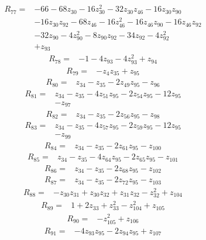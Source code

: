 \begin{align*}
R_{77}={}&-66-68z_{30}-16z_{30}^{2}-32z_{30}z_{46}-16z_{30}z_{90}\\
&-16z_{30}z_{92}-68z_{46}-16z_{46}^{2}-16z_{46}z_{90}-16z_{46}z_{92}\\
&-32z_{90}-4z_{90}^{2}-8z_{90}z_{92}-34z_{92}-4z_{92}^{2}\\
&+z_{93}
\end{align*}
\begin{align*}
R_{78}={}&-1-4z_{93}-4z_{93}^{2}+z_{94}
\end{align*}
\begin{align*}
R_{79}={}&-z_{4}z_{35}+z_{95}
\end{align*}
\begin{align*}
R_{80}={}&z_{34}-z_{35}-2z_{49}z_{95}-z_{96}
\end{align*}
\begin{align*}
R_{81}={}&z_{34}-z_{35}-4z_{51}z_{95}-2z_{54}z_{95}-12z_{95}\\
&-z_{97}
\end{align*}
\begin{align*}
R_{82}={}&z_{34}-z_{35}-2z_{56}z_{95}-z_{98}
\end{align*}
\begin{align*}
R_{83}={}&z_{34}-z_{35}-4z_{57}z_{95}-2z_{59}z_{95}-12z_{95}\\
&-z_{99}
\end{align*}
\begin{align*}
R_{84}={}&z_{34}-z_{35}-2z_{61}z_{95}-z_{100}
\end{align*}
\begin{align*}
R_{85}={}&z_{34}-z_{35}-4z_{64}z_{95}-2z_{65}z_{95}-z_{101}
\end{align*}
\begin{align*}
R_{86}={}&z_{34}-z_{35}-2z_{68}z_{95}-z_{102}
\end{align*}
\begin{align*}
R_{87}={}&z_{34}-z_{35}-2z_{72}z_{95}-z_{103}
\end{align*}
\begin{align*}
R_{88}={}&-z_{30}z_{31}+z_{30}z_{32}+z_{31}z_{32}-z_{32}^{2}+z_{104}
\end{align*}
\begin{align*}
R_{89}={}&1+2z_{33}+z_{33}^{2}-z_{104}^{2}+z_{105}
\end{align*}
\begin{align*}
R_{90}={}&-z_{105}^{2}+z_{106}
\end{align*}
\begin{align*}
R_{91}={}&-4z_{93}z_{95}-2z_{94}z_{95}+z_{107}
\end{align*}
